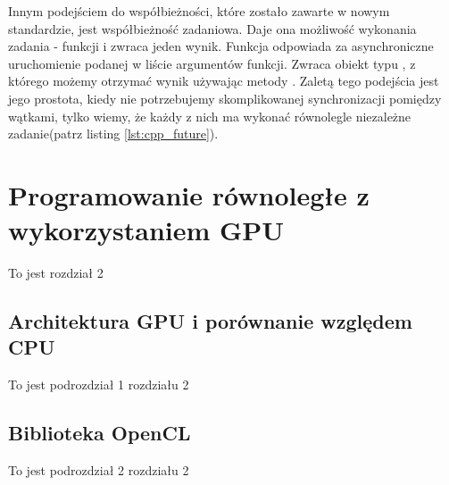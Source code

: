 \documentclass[document.tex]{subfiles}
\begin{document}
\indent Innym podejściem do współbieżności, które zostało zawarte w nowym standardzie,
jest współbieżność zadaniowa. Daje ona możliwość wykonania zadania - funkcji i zwraca
jeden wynik. Funkcja  odpowiada za asynchroniczne uruchomienie podanej w liście argumentów funkcji. Zwraca obiekt typu , z którego
możemy otrzymać wynik używając metody . Zaletą tego podejścia jest jego prostota, kiedy nie potrzebujemy skomplikowanej synchronizacji pomiędzy wątkami,
tylko wiemy, że każdy z nich ma wykonać równolegle niezależne zadanie(patrz listing \ref{lst:cpp_future}). 
\cite{C++_Meyers}\cite{C++_Stroustrup}
\\





\section{Programowanie równoległe z wykorzystaniem GPU}
To jest rozdział 2

\subsection{Architektura GPU i porównanie względem CPU}
To jest podrozdział 1 rozdziału 2

\subsection{Biblioteka OpenCL}
To jest podrozdział 2 rozdziału 2

\end{document}
